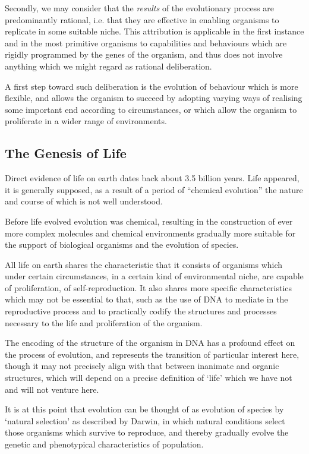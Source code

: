 \documentclass[10pt,titlepage]{book}
\begin{document}
Secondly, we may consider that the \emph{results} of the evolutionary process are predominantly rational, i.e. that they are effective in enabling organisms to replicate in some suitable niche.
This attribution is applicable in the first instance and in the most primitive organisms to capabilities and behaviours which are rigidly programmed by the genes of the organism, and thus does not involve anything which we might regard as rational deliberation.

A first step toward such deliberation is the evolution of behaviour which is more flexible, and allows the organism to succeed by adopting varying ways of realising some important end according to circumstances, or which allow the organism to proliferate in a wider range of environments.

\subsection{The Genesis of Life}

Direct evidence of life on earth dates back about 3.5 billion years.
Life appeared, it is generally supposed, as a result of a period of ``chemical evolution'' the nature and course of which is not well understood.



Before life evolved evolution was chemical, resulting in the construction of ever more complex molecules and chemical environments gradually more suitable for the support of biological organisms and the evolution of species.

All life on earth shares the characteristic that it consists of organisms which under certain circumstances, in a certain kind of environmental niche, are capable of proliferation, of self-reproduction.
It also shares more specific characteristics which may not be essential to that, such as the use of DNA to mediate in the reproductive process and to practically codify the structures and processes necessary to the life and proliferation of the organism.

The encoding of the structure of the organism in DNA has a profound effect on the process of evolution, and represents the transition of particular interest here, though it may not precisely align with that between inanimate and organic structures, which will depend on a precise definition of `life' which we have not and will not venture here.

It is at this point that evolution can be thought of as evolution of species by `natural selection' as described by Darwin, in which natural conditions select those organisms which survive to reproduce, and thereby gradually evolve the genetic and phenotypical characteristics of population.
\end{document}
